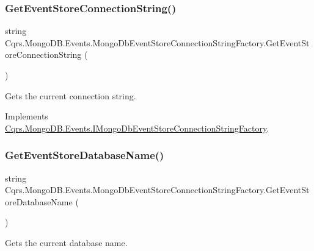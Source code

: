\subsubsection{\texorpdfstring{Get\+Event\+Store\+Connection\+String()}{GetEventStoreConnectionString()}}
{\footnotesize\ttfamily string Cqrs.\+Mongo\+D\+B.\+Events.\+Mongo\+Db\+Event\+Store\+Connection\+String\+Factory.\+Get\+Event\+Store\+Connection\+String (\begin{DoxyParamCaption}{ }\end{DoxyParamCaption})}



Gets the current connection string. 



Implements \hyperlink{interfaceCqrs_1_1MongoDB_1_1Events_1_1IMongoDbEventStoreConnectionStringFactory_a3860ea4bf6793b081f03fb7cc1dcbb27_a3860ea4bf6793b081f03fb7cc1dcbb27}{Cqrs.\+Mongo\+D\+B.\+Events.\+I\+Mongo\+Db\+Event\+Store\+Connection\+String\+Factory}.

\mbox{\label{classCqrs_1_1MongoDB_1_1Events_1_1MongoDbEventStoreConnectionStringFactory_a282bda17095c8ea293f5305ea0d1b83c_a282bda17095c8ea293f5305ea0d1b83c}} 
\subsubsection{\texorpdfstring{Get\+Event\+Store\+Database\+Name()}{GetEventStoreDatabaseName()}}
{\footnotesize\ttfamily string Cqrs.\+Mongo\+D\+B.\+Events.\+Mongo\+Db\+Event\+Store\+Connection\+String\+Factory.\+Get\+Event\+Store\+Database\+Name (\begin{DoxyParamCaption}{ }\end{DoxyParamCaption})}



Gets the current database name. 



